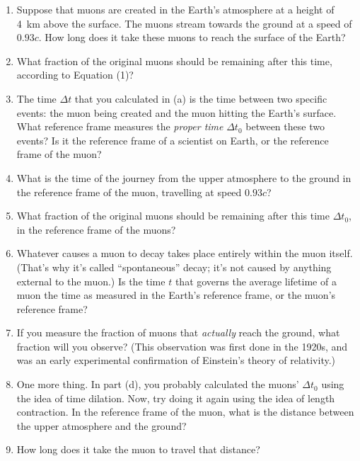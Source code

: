 \begin{enumerate}[labparts]
\item   
Suppose that muons are created in the Earth's atmosphere at a height of 4~km above the surface.  The muons stream towards the ground at a speed of $0.93c$.
How long does it take these muons to reach the surface of the Earth?
\answerspace{0.8in}

\item What fraction of the original muons should be remaining after this time, according to Equation (1)? 
\answerspace{0.6in}

\item The time $\Delta t$ that you calculated in (a) is the time between two specific events: the muon being created and the muon hitting the Earth's surface.  What reference frame measures the \textit{proper time} $\Delta t_0$ between these two events?  Is it the reference frame of a scientist on Earth, or the reference frame of the muon?
\answerspace{0.4in}

\item What is the time of the journey from the upper atmosphere to the ground in the reference frame of the muon, travelling at speed $0.93c$?
\answerspace{0.8in}

\item What fraction of the original muons should be remaining after this time $\Delta t_0$, in the reference frame of the muons?
\answerspace{0.6in}

\item Whatever causes a muon to decay takes place entirely within the muon itself.  (That's why it's called ``spontaneous'' decay; it's not caused by anything external to the muon.)  
Is the time $t$ that governs the average lifetime of a muon the time as measured in the Earth's reference frame, or the muon's reference frame?  
\answerspace{0.4in}

\item If you measure the fraction of muons that \textit{actually} reach the ground, what fraction will you observe?
(This observation was first done in the 1920s, and was an early experimental confirmation of Einstein's theory of relativity.)
\answerspace{0.4in}

\item One more thing.  In part (d), you probably calculated the muons' $\Delta t_0$ using the idea of time dilation.  Now, try doing it again using the idea of length contraction.  In the reference frame of the muon, what is the distance between the upper atmosphere and the ground?
\answerspace{0.8in}

\item How long does it take the muon to travel that distance?
\answerspace{0.6in}

\end{enumerate}

